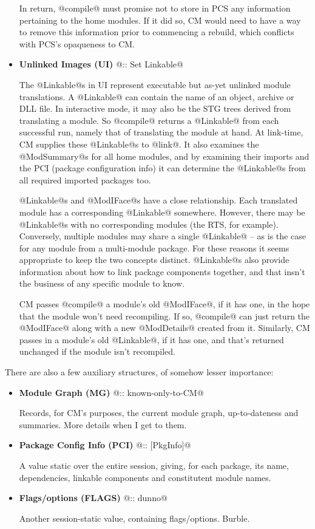 \documentclass[11pt]{article}
\begin{document}
\begin{itemize}
   In return, @compile@ must promise not to store in PCS any
   information pertaining to the home modules.  If it did so, CM would
   need to have a way to remove this information prior to commencing a
   rebuild, which conflicts with PCS's opaqueness to CM.

\item
   {\bf Unlinked Images (UI)} @:: Set Linkable@

   The @Linkable@s in UI represent executable but as-yet unlinked
   module translations.  A @Linkable@ can contain the name of an
   object, archive or DLL file.  In interactive mode, it may also be
   the STG trees derived from translating a module.  So @compile@
   returns a @Linkable@ from each successful run, namely that of
   translating the module at hand.  At link-time, CM supplies these
   @Linkable@s to @link@.  It also examines the @ModSummary@s for all
   home modules, and by examining their imports and the PCI (package
   configuration info) it can determine the @Linkable@s from all
   required imported packages too.

   @Linkable@s and @ModIFace@s have a close relationship.  Each
   translated module has a corresponding @Linkable@ somewhere.
   However, there may be @Linkable@s with no corresponding modules
   (the RTS, for example).  Conversely, multiple modules may share a
   single @Linkable@ -- as is the case for any module from a
   multi-module package.  For these reasons it seems appropriate to
   keep the two concepts distinct.  @Linkable@s also provide
   information about how to link package components together, and that
   insn't the business of any specific module to know.

   CM passes @compile@ a module's old @ModIFace@, if it has one, in
   the hope that the module won't need recompiling.  If so, @compile@
   can just return the @ModIFace@ along with a new @ModDetails@
   created from it.  Similarly, CM passes in a module's old
   @Linkable@, if it has one, and that's returned unchanged if the
   module isn't recompiled.

\end{itemize}

There are also a few auxiliary structures, of somehow lesser importance:

\begin{itemize}
\item 
   {\bf Module Graph (MG)} @:: known-only-to-CM@

   Records, for CM's purposes, the current module graph,
   up-to-dateness and summaries.  More details when I get to them.

\item
   {\bf Package Config Info (PCI)} @:: [PkgInfo]@
   
   A value static over the entire session, giving, for each package,
   its name, dependencies, linkable components and constitutent module
   names.

\item
   {\bf Flags/options (FLAGS)} @:: dunno@
   
   Another session-static value, containing flags/options.  Burble.
\end{itemize}
\end{document}
